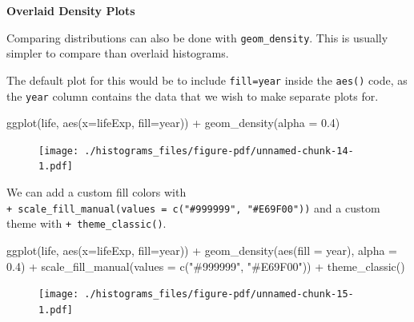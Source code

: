 \documentclass[
  letterpaper,
  DIV=11,
  numbers=noendperiod]{scrreprt}
\newenvironment{Shaded}{\begin{snugshade}}{\end{snugshade}}
\newcommand{\AttributeTok}[1]{\textcolor[rgb]{0.40,0.45,0.13}{#1}}
\newcommand{\FloatTok}[1]{\textcolor[rgb]{0.68,0.00,0.00}{#1}}
\newcommand{\FunctionTok}[1]{\textcolor[rgb]{0.28,0.35,0.67}{#1}}
\newcommand{\NormalTok}[1]{\textcolor[rgb]{0.00,0.23,0.31}{#1}}
\newcommand{\SpecialCharTok}[1]{\textcolor[rgb]{0.37,0.37,0.37}{#1}}
\newcommand{\StringTok}[1]{\textcolor[rgb]{0.13,0.47,0.30}{#1}}
\begin{document}
\textbf{Overlaid Density Plots}

Comparing distributions can also be done with \texttt{geom\_density}.
This is usually simpler to compare than overlaid histograms.

The default plot for this would be to include \texttt{fill=year} inside
the \texttt{aes()} code, as the \texttt{year} column contains the data
that we wish to make separate plots for.

\begin{Shaded}
\begin{Highlighting}[]
\FunctionTok{ggplot}\NormalTok{(life, }\FunctionTok{aes}\NormalTok{(}\AttributeTok{x=}\NormalTok{lifeExp, }\AttributeTok{fill=}\NormalTok{year)) }\SpecialCharTok{+}  
  \FunctionTok{geom\_density}\NormalTok{(}\AttributeTok{alpha =} \FloatTok{0.4}\NormalTok{) }
\end{Highlighting}
\end{Shaded}

\begin{figure}[H]

{\centering \texttt{[image: ./histograms\_files/figure-pdf/unnamed-chunk-14-1.pdf]}

}

\end{figure}

We can add a custom fill colors with
\texttt{+\ scale\_fill\_manual(values\ =\ c("\#999999",\ "\#E69F00"))}
and a custom theme with \texttt{+\ theme\_classic()}.

\begin{Shaded}
\begin{Highlighting}[]
\FunctionTok{ggplot}\NormalTok{(life, }\FunctionTok{aes}\NormalTok{(}\AttributeTok{x=}\NormalTok{lifeExp, }\AttributeTok{fill=}\NormalTok{year)) }\SpecialCharTok{+}  
  \FunctionTok{geom\_density}\NormalTok{(}\FunctionTok{aes}\NormalTok{(}\AttributeTok{fill =}\NormalTok{ year), }\AttributeTok{alpha =} \FloatTok{0.4}\NormalTok{) }\SpecialCharTok{+}
  \FunctionTok{scale\_fill\_manual}\NormalTok{(}\AttributeTok{values =} \FunctionTok{c}\NormalTok{(}\StringTok{"\#999999"}\NormalTok{, }\StringTok{"\#E69F00"}\NormalTok{))  }\SpecialCharTok{+} 
  \FunctionTok{theme\_classic}\NormalTok{()}
\end{Highlighting}
\end{Shaded}

\begin{figure}[H]

{\centering \texttt{[image: ./histograms\_files/figure-pdf/unnamed-chunk-15-1.pdf]}

}

\end{figure}
\end{document}
